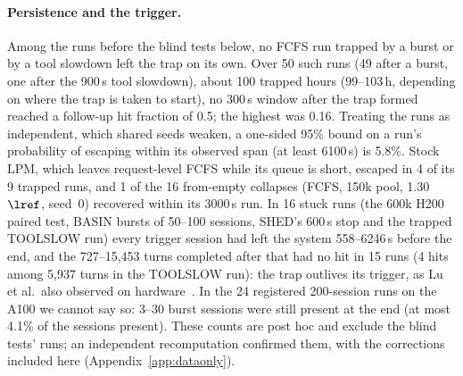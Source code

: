 \paragraph{Persistence and the trigger.} Among the runs before the blind tests below, no FCFS run trapped by a burst or by a tool
slowdown left the trap on its own. Over 50 such runs (49 after a burst, one after the 900\,s tool slowdown), about 100 trapped hours (99--103\,h, depending on where the trap is
taken to start), no 300\,s window after the trap formed reached a follow-up hit fraction of 0.5; the highest was 0.16. Treating the
runs as independent, which shared seeds weaken, a one-sided 95\% bound on a run's probability of escaping within its observed span
(at least 6100\,s) is 5.8\%. Stock LPM, which leaves request-level FCFS while its queue is short, escaped in 4 of its 9 trapped runs,
and 1 of the 16 from-empty collapses (FCFS, 150k pool, 1.30~$\lref$, seed~0) recovered within its 3000\,s run. In 16 stuck runs (the
600k H200 paired test, BASIN bursts of 50--100 sessions, SHED's 600\,s stop and the trapped TOOLSLOW run) every trigger session had
left the system 558--6246\,s before the end, and the 727--15{,}453 turns completed after that had no hit in 15 runs (4 hits among
5{,}937 turns in the TOOLSLOW run): the trap outlives its trigger, as Lu et al.\ also observed on hardware~\citep{lu2026cachetrap}.
In the 24 registered 200-session runs on the A100 we cannot say so: 3--30 burst sessions were still present at the end (at most
4.1\% of the sessions present). These counts are post hoc and exclude the blind tests' runs; an independent recomputation confirmed them, with
the corrections included here (Appendix~\ref{app:dataonly}).

